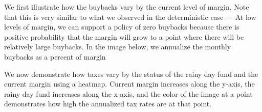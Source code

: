 We first illustrate how the buybacks vary by the current level of margin. Note that this is very
similar to what we observed in the deterministic case --- At low levels of margin, we can support
a policy of zero buybacks because there is positive probability that the margin will grow to a point
where there will be relatively large buybacks. In the image below, we annualize the monthly buybacks
as a percent of margin

\begin{center}
  \begin{figure}[H]
    \label{fig:sm_stochastic_buybacks}
  \end{figure}
\end{center}

We now demonstrate how taxes vary by the status of the rainy day fund and the current margin using
a heatmap. Current margin increases along the y-axis, the rainy day fund increases along the x-axis,
and the color of the image at a point demonstrates how high the annualized tax rates are at that
point.

\begin{center}
  \begin{figure}[H]
    \label{fig:sm_annualized_taxrates}
  \end{figure}
\end{center}

